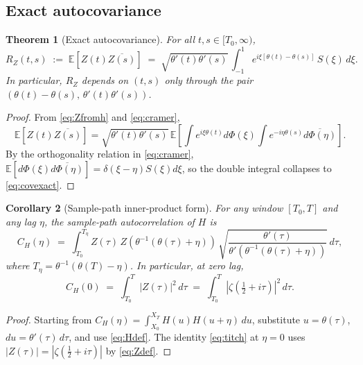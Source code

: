 \documentclass[11pt]{amsart}
\newtheorem{theorem}{Theorem}[section]
\newtheorem{corollary}[theorem]{Corollary}
\theoremstyle{definition}
\begin{document}
\subsection{Exact autocovariance}

\begin{theorem}[Exact autocovariance]\label{thm:cov}
For all $t,s\in[T_{0},\infty)$,
\begin{equation}\label{eq:covexact}
R_{Z}(t,s) \;:=\; \mathbb{E}[Z(t)\overline{Z(s)}]
\;=\; \sqrt{\theta'(t)\theta'(s)}\,
\int_{-1}^{1}e^{i\xi[\theta(t)-\theta(s)]}\,S(\xi)\,d\xi.
\end{equation}
In particular, $R_{Z}$ depends on $(t,s)$ only through the pair
$(\theta(t)-\theta(s),\,\theta'(t)\theta'(s))$.
\end{theorem}

\begin{proof}
From \eqref{eq:Zfromh} and \eqref{eq:cramer},
\[
\mathbb{E}[Z(t)\overline{Z(s)}]
=\sqrt{\theta'(t)\theta'(s)}\,\mathbb{E}\!\left[\int e^{i\xi\theta(t)}d\Phi(\xi)\int e^{-i\eta\theta(s)}\overline{d\Phi(\eta)}\right].
\]
By the orthogonality relation in \eqref{eq:cramer},
$\mathbb{E}[d\Phi(\xi)\overline{d\Phi(\eta)}]=\delta(\xi-\eta)S(\xi)d\xi$,
so the double integral collapses to \eqref{eq:covexact}.
\end{proof}

\begin{corollary}[Sample-path inner-product form]\label{cor:sample}
For any window $[T_{0},T]$ and any lag $\eta$, the sample-path
autocorrelation of $H$ is
\begin{equation}\label{eq:samplepath}
C_{H}(\eta) \;=\; \int_{T_{0}}^{T_{\eta}} Z(\tau)\,Z(\theta^{-1}(\theta(\tau)+\eta))\,\sqrt{\frac{\theta'(\tau)}{\theta'(\theta^{-1}(\theta(\tau)+\eta))}}\,d\tau,
\end{equation}
where $T_{\eta}=\theta^{-1}(\theta(T)-\eta)$. In particular, at zero lag,
\begin{equation}\label{eq:titch}
C_{H}(0) \;=\; \int_{T_{0}}^{T}|Z(\tau)|^{2}\,d\tau \;=\; \int_{T_{0}}^{T}\left|\zeta\!\left(\tfrac{1}{2}+i\tau\right)\right|^{2}\,d\tau.
\end{equation}
\end{corollary}

\begin{proof}
Starting from $C_{H}(\eta)=\int_{X_{0}}^{X_{T}}H(u)H(u+\eta)\,du$, substitute
$u=\theta(\tau)$, $du=\theta'(\tau)\,d\tau$, and use \eqref{eq:Hdef}. The
identity \eqref{eq:titch} at $\eta=0$ uses $|Z(\tau)|=|\zeta(\tfrac12+i\tau)|$
by \eqref{eq:Zdef}.
\end{proof}
\end{document}
